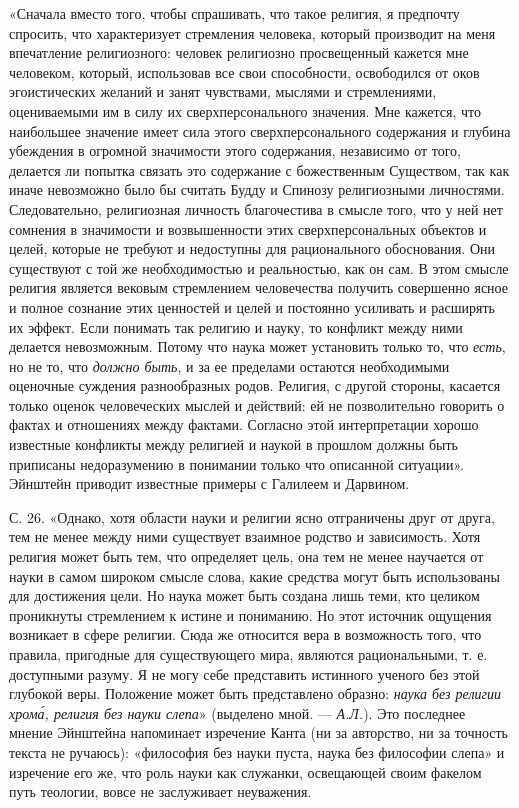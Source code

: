 «Сначала вместо того, чтобы спрашивать, что такое религия, я
предпочту спросить, что характеризует стремления человека, который
производит на меня впечатление религиозного: человек религиозно
просвещенный кажется мне человеком, который, использовав все свои
способности, освободился от оков эгоистических желаний и занят
чувствами, мыслями и стремлениями, оцениваемыми им в силу их
сверхперсонального значения. Мне кажется, что наибольшее значение
имеет сила этого сверхперсонального содержания и глубина убеждения в
огромной значимости этого содержания, независимо от того, делается
ли попытка связать это содержание с божественным Существом, так
как иначе невозможно было бы считать Будду и Спинозу религиозными
личностями. Следовательно, религиозная личность благочестива в смысле
того, что у ней нет сомнения в значимости и возвышенности этих
сверхперсональных объектов и целей, которые не требуют и недоступны
для рационального обоснования. Они существуют с той же необходимостью
и реальностью, как он сам. В этом смысле религия является вековым
стремлением человечества получить совершенно ясное и полное сознание
этих ценностей и целей и постоянно усиливать и расширять их эффект.
Если понимать так религию и науку, то конфликт между ними делается
невозможным. Потому что наука может установить только то, что
\emph{есть}, но не то, что \emph{должно быть}, и за ее пределами
остаются необходимыми оценочные суждения разнообразных родов. Религия,
с другой стороны, касается только оценок человеческих мыслей и
действий: ей не позволительно говорить о фактах и отношениях между
фактами. Согласно этой интерпретации хорошо известные конфликты между
религией и наукой в прошлом должны быть приписаны недоразумению в
понимании только что описанной ситуации». Эйнштейн приводит известные
примеры с Галилеем и Дарвином.

С. 26. «Однако, хотя области науки и религии ясно отграничены друг от друга,
тем не менее между ними существует взаимное родство и зависимость. Хотя религия
может быть тем, что определяет цель, она тем не менее научается от науки в
самом широком смысле слова, какие средства могут быть использованы для
достижения цели. Но наука может быть создана лишь теми, кто целиком проникнуты
стремлением к истине и пониманию. Но этот источник ощущения возникает в сфере
религии. Сюда же относится вера в возможность того, что правила, пригодные для
существующего мира, являются рациональными, т. е. доступными разуму. Я не могу
себе представить истинного ученого без этой глубокой веры. Положение может быть
представлено образно: \emph{наука без религии хром\'{а}, религия без науки слепа}»
(выделено мной. --- \emph{А.Л.}). Это последнее мнение Эйнштейна напоминает
изречение Канта (ни за авторство, ни за точность текста не ручаюсь): «философия
без науки пуста, наука без философии слепа» и изречение его же, что роль науки
как служанки, освещающей своим факелом путь теологии, вовсе не заслуживает
неуважения.

